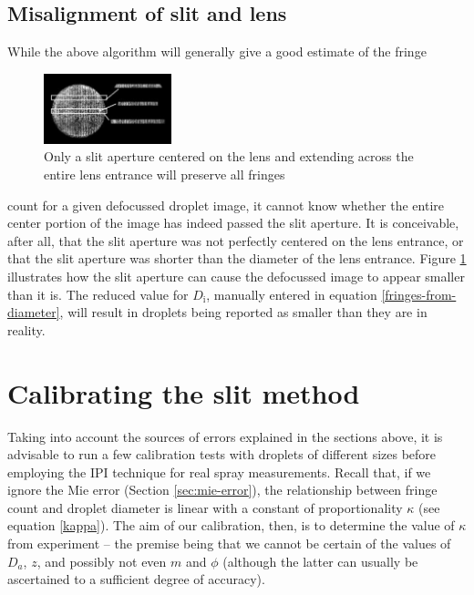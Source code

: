 \documentclass[10pt]{book}
\begin{document}
\subsection{Misalignment of slit and lens}

While the above algorithm will generally give a good estimate of the fringe
\begin{figure}
    \begin{center}
\includegraphics[width=0.33\textwidth]{img/dropletslitcropping2.jpg}
\end{center}
\caption{Only a slit aperture centered on the lens and extending across the
entire lens entrance will preserve all fringes}
\label{fig:droplet-slitcropping}
\end{figure}

count for a given defocussed droplet image, it cannot know whether the entire
center portion of the image has indeed passed the slit aperture. It is
conceivable, after all, that the slit aperture was not perfectly centered on the
lens entrance, or that the slit aperture was shorter than the diameter of the
lens entrance. Figure \ref{fig:droplet-slitcropping} illustrates how the slit
aperture can cause the defocussed image to appear smaller than it is. The
reduced value for $D_\text{i}$, manually entered in equation
\eqref{fringes-from-diameter}, will result
in droplets being reported as smaller than they are in reality.

\section{Calibrating the slit method}
Taking into account the sources of errors explained in the sections above, it is
advisable to run a few calibration tests with droplets of different sizes before
employing the IPI technique for real spray measurements. Recall that, if we
ignore the Mie error (Section \ref{sec:mie-error}), the relationship between fringe count and droplet diameter
is linear with a constant of proportionality $\kappa$ (see equation
\eqref{kappa}). The aim of our calibration, then, is to determine the value of
$\kappa$ from experiment -- the premise being that we cannot be certain of the
values of $D_a$, $z$, and possibly not even $m$ and $\phi$ (although the latter
can usually be ascertained to a sufficient degree of accuracy).
\end{document}
